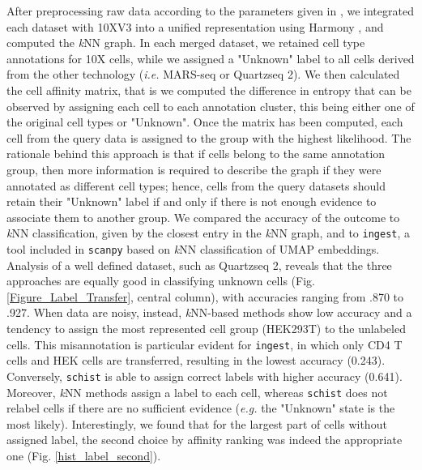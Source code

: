 \documentclass[10pt]{article}
\begin{document}
After preprocessing raw data according to the parameters given in \cite{mereu_2020}, we integrated each dataset with 10XV3 into a unified representation using Harmony \cite{Korsunsky_2019}, and computed the \emph{k}NN graph. In each merged dataset, we retained cell type annotations for 10X cells, while we assigned a "Unknown" label to all cells derived from the other technology (\emph{i.e.} MARS-seq or Quartzseq 2). We then calculated the cell affinity matrix, that is we computed the difference in entropy that can be observed by assigning each cell to each annotation cluster, this being either one of the original cell types or "Unknown". Once the matrix has been computed, each cell from the query data is assigned to the group with the highest likelihood. The rationale behind this approach is that if cells belong to the same annotation group, then more information is required to describe the graph if they were annotated as different cell types; hence, cells from the query datasets should retain their "Unknown" label if and only if there is not enough evidence to associate them to another group. We compared the accuracy of the  outcome to \emph{k}NN classification, given by the closest entry in the \emph{k}NN graph, and to \texttt{ingest}, a tool included in \texttt{scanpy}  based on \emph{k}NN classification of UMAP embeddings. Analysis of a well defined dataset, such as Quartzseq 2, reveals that the three approaches are equally good in classifying unknown cells (Fig. \ref{Figure_Label_Transfer}, central column), with accuracies ranging from .870 to .927. When data are noisy, instead, \emph{k}NN-based methods show low accuracy and a tendency to assign the most represented cell group (HEK293T) to the unlabeled cells. This misannotation is particular evident for \texttt{ingest}, in which only CD4 T cells and HEK cells are transferred, resulting in the lowest accuracy (0.243). Conversely, \texttt{schist} is able to assign correct labels with higher accuracy (0.641). Moreover, \emph{k}NN methods assign a label to each cell, whereas \texttt{schist} does not relabel cells if there are no sufficient evidence (\emph{e.g.} the "Unknown" state is the most likely). Interestingly, we found that for the largest part of cells without assigned label, the second choice by affinity ranking was indeed the appropriate one (Fig. \ref{hist_label_second}).
\end{document}
